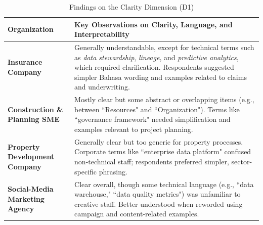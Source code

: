 \documentclass[conference]{IEEEtran}
\begin{document}
\begin{table}[t]
\centering
\caption{Findings on the Clarity Dimension (D1)}
\label{tab:d1_clarity}
\renewcommand{\arraystretch}{1.2}
\begin{tabular}{p{.16\linewidth} p{.74\linewidth}}
\hline
\textbf{Organization} & \textbf{Key Observations on Clarity, Language, and Interpretability} \\ \hline

\textbf{Insurance Company} & 
Generally understandable, except for technical terms such as \emph{data stewardship}, \emph{lineage}, and \emph{predictive analytics}, which required clarification.  
Respondents suggested simpler Bahasa wording and examples related to claims and underwriting. \\ \hline

\textbf{Construction \& Planning SME} & 
Mostly clear but some abstract or overlapping items (e.g., between ``Resources" and ``Organization").  
Terms like ``governance framework" needed simplification and examples relevant to project planning. \\ \hline

\textbf{Property Development Company} & 
Generally clear but too generic for property processes.  
Corporate terms like ``enterprise data platform" confused non-technical staff; respondents preferred simpler, sector-specific phrasing. \\ \hline

\textbf{Social-Media Marketing Agency} & 
Clear overall, though some technical language (e.g., ``data warehouse," ``data quality metrics") was unfamiliar to creative staff.  
Better understood when reworded using campaign and content-related examples. \\ \hline
\end{tabular}
\end{table}
\end{document}
